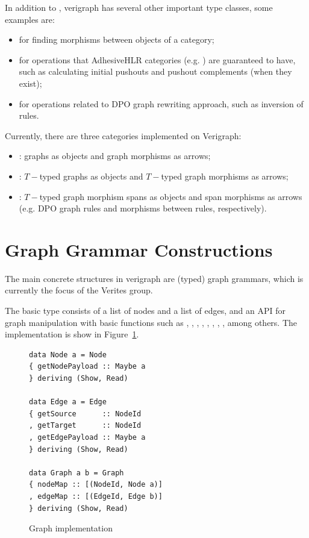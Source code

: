 In addition to , verigraph has several other important type classes, some examples are:
\begin{itemize}
  \item {} for finding morphisms between objects of a category;
  \item {} for operations that AdhesiveHLR categories (e.g. ) are guaranteed to have, such as calculating initial pushouts and pushout complements (when they exist);
  \item {} for operations related to DPO graph rewriting approach, such as inversion of rules.
\end{itemize}

Currently, there are three categories implemented on Verigraph: 

\begin{itemize}
  \item {}: graphs as objects and graph morphisms as arrows; 
  \item {}: $T-$typed graphs as objects and $T-$typed graph morphisms as arrows; 
  \item {}: $T-$typed graph morphism spans as objects and span morphisms as arrows (e.g. DPO graph rules and morphisms between rules, respectively).
\end{itemize}

\section{Graph Grammar Constructions}

The main concrete structures in verigraph are (typed) graph grammars, which is currently the focus of the Verites group. 

The basic  type consists of a list of nodes and a list of edges, and an API for graph manipulation with basic functions such as , , , , , , , , among others. The  implementation is show in Figure~\ref{fig:verigraph:graph}.

\begin{figure}[!ht]

\caption{Graph implementation}
\begin{verbatim}
data Node a = Node 
{ getNodePayload :: Maybe a
} deriving (Show, Read)

data Edge a = Edge 
{ getSource      :: NodeId
, getTarget      :: NodeId
, getEdgePayload :: Maybe a
} deriving (Show, Read)

data Graph a b = Graph 
{ nodeMap :: [(NodeId, Node a)]
, edgeMap :: [(EdgeId, Edge b)]
} deriving (Show, Read)
\end{verbatim}
\label{fig:verigraph:graph}
\end{figure}

